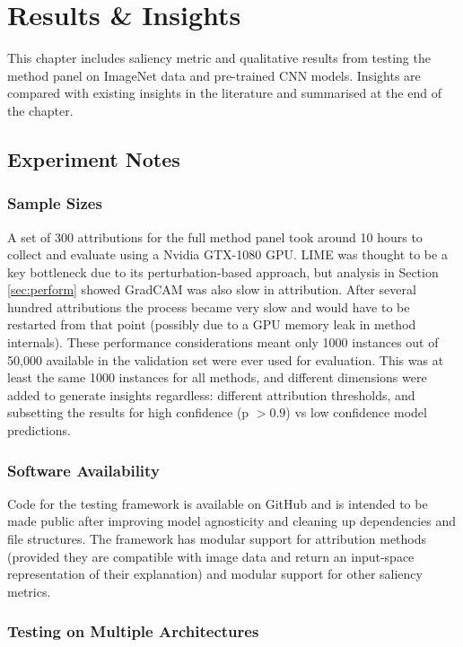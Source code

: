 \documentclass[main]{subfiles}
\begin{document}
\chapter{Results \& Insights}


This chapter includes saliency metric and qualitative results from testing the method panel on ImageNet data and pre-trained CNN models. Insights are compared with existing insights in the literature and summarised at the end of the chapter.

\section{Experiment Notes}

\subsection{Sample Sizes}  \label{sec:data_collection}
A set of 300 attributions for the full method panel took around 10 hours to collect and evaluate using a Nvidia GTX-1080 GPU. LIME was thought to be a key bottleneck due to its perturbation-based approach, but analysis in Section \ref{sec:perform} showed GradCAM was also slow in attribution. After several hundred attributions the process became very slow and would have to be restarted from that point (possibly due to a GPU memory leak in method internals). These performance considerations meant only 1000 instances out of 50,000 available in the validation set were ever used for evaluation. This was at least the same 1000 instances for all methods, and different dimensions were added to generate insights regardless: different attribution thresholds, and subsetting the results for high confidence (p $>0.9$) vs low confidence model predictions.

\subsection{Software Availability}

Code for the testing framework is available on GitHub and is intended to be made public after improving model agnosticity and cleaning up dependencies and file structures. The framework has modular support for attribution methods (provided they are compatible with image data and return an input-space representation of their explanation) and modular support for other saliency metrics.


\subsection{Testing on Multiple Architectures} \label{sec:shap_note}
\end{document}
